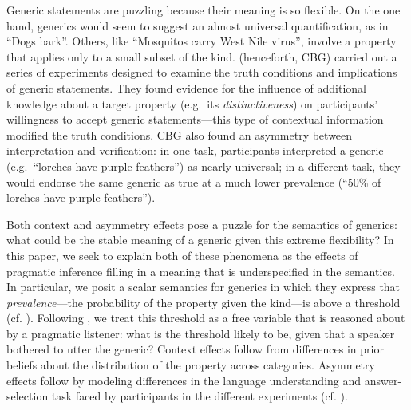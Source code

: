 \documentclass[10pt,letterpaper]{article}
\begin{document}
Generic statements are puzzling because their meaning is so flexible. On the one hand, generics would seem to suggest an almost universal quantification, as in ``Dogs bark''. Others, like ``Mosquitos carry West Nile virus'', involve a property that applies only to a small subset of the kind. 
 (henceforth, CBG) carried out a series of experiments designed to examine the truth conditions and implications of generic statements. 
They found evidence for the influence of additional knowledge about a target property (e.g.~its \emph{distinctiveness}) on participants' willingness to accept generic statements---this type of contextual information modified the truth conditions. CBG also found an asymmetry between  interpretation and verification: in one task, participants interpreted a generic (e.g.~``lorches have purple feathers'') as nearly universal; in a different task, they would endorse the same generic as true at a much lower prevalence (``50\% of lorches have purple feathers'').

Both context and asymmetry effects pose a puzzle for the semantics of generics: what could be the stable meaning of a generic given this extreme flexibility? 
In this paper, we seek to explain both of these phenomena as the effects of pragmatic inference filling in a meaning that is underspecified in the semantics. 
In particular, we posit a scalar semantics for generics in which they express that \emph{prevalence}---the probability of the property given the kind---is above a threshold (cf. ). Following , we treat this threshold as a free variable that is reasoned about by a pragmatic listener: what is the threshold likely to be, given that a speaker bothered to utter the generic? Context effects follow from differences in prior beliefs about the distribution of the property across categories. Asymmetry effects follow by modeling differences in the language understanding and answer-selection task faced by participants in the different experiments (cf. ).  %

\end{document}
